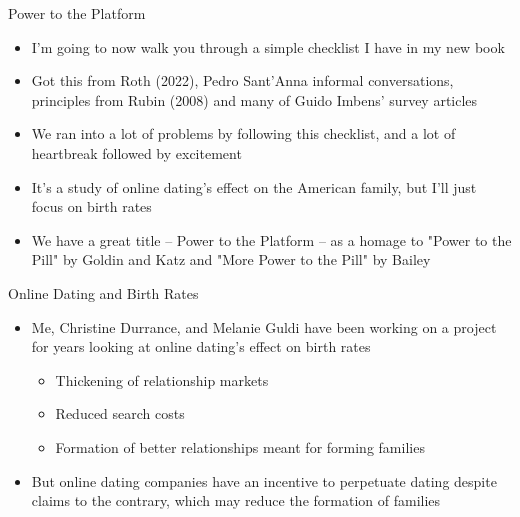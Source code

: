 \documentclass{beamer}
\begin{document}
\begin{frame}{Power to the Platform}

\begin{itemize}
\item I'm going to now walk you through a simple checklist I have in my new book
\item Got this from Roth (2022), Pedro Sant'Anna informal conversations, principles from Rubin (2008) and many of Guido Imbens' survey articles
\item We ran into a lot of problems by following this checklist, and a lot of heartbreak followed by excitement
\item It's a study of online dating's effect on the American family, but I'll just focus on birth rates
\item We have a great title -- Power to the Platform -- as a homage to "Power to the Pill" by Goldin and Katz and "More Power to the Pill" by Bailey
\end{itemize}

\end{frame}





\begin{frame}{Online Dating and Birth Rates}

\begin{itemize}
\item Me, Christine Durrance, and Melanie Guldi have been working on a project for years looking at online dating's effect on birth rates
	\begin{itemize}
	\item Thickening of relationship markets
	\item Reduced search costs
	\item Formation of better relationships meant for forming families
	\end{itemize}
\item But online dating companies have an incentive to perpetuate dating despite claims to the contrary, which may reduce the formation of families
\end{itemize}
\end{frame}
\end{document}
